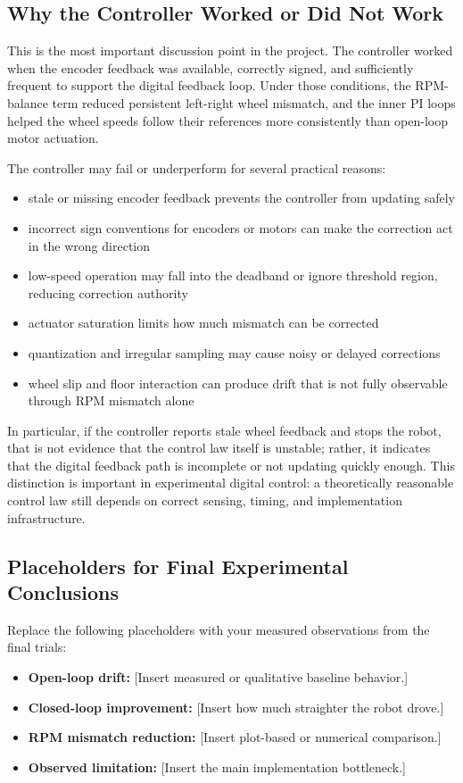 \documentclass[conference]{IEEEtran}
\begin{document}
\subsection{Why the Controller Worked or Did Not Work}
This is the most important discussion point in the project. The controller worked when the encoder feedback was available, correctly signed, and sufficiently frequent to support the digital feedback loop. Under those conditions, the RPM-balance term reduced persistent left-right wheel mismatch, and the inner PI loops helped the wheel speeds follow their references more consistently than open-loop motor actuation.

The controller may fail or underperform for several practical reasons:
\begin{itemize}
\item stale or missing encoder feedback prevents the controller from updating safely
\item incorrect sign conventions for encoders or motors can make the correction act in the wrong direction
\item low-speed operation may fall into the deadband or ignore threshold region, reducing correction authority
\item actuator saturation limits how much mismatch can be corrected
\item quantization and irregular sampling may cause noisy or delayed corrections
\item wheel slip and floor interaction can produce drift that is not fully observable through RPM mismatch alone
\end{itemize}

In particular, if the controller reports stale wheel feedback and stops the robot, that is not evidence that the control law itself is unstable; rather, it indicates that the digital feedback path is incomplete or not updating quickly enough. This distinction is important in experimental digital control: a theoretically reasonable control law still depends on correct sensing, timing, and implementation infrastructure.

\subsection{Placeholders for Final Experimental Conclusions}
Replace the following placeholders with your measured observations from the final trials:
\begin{itemize}
\item \textbf{Open-loop drift:} [Insert measured or qualitative baseline behavior.]
\item \textbf{Closed-loop improvement:} [Insert how much straighter the robot drove.]
\item \textbf{RPM mismatch reduction:} [Insert plot-based or numerical comparison.]
\item \textbf{Observed limitation:} [Insert the main implementation bottleneck.]
\end{itemize}
\end{document}
